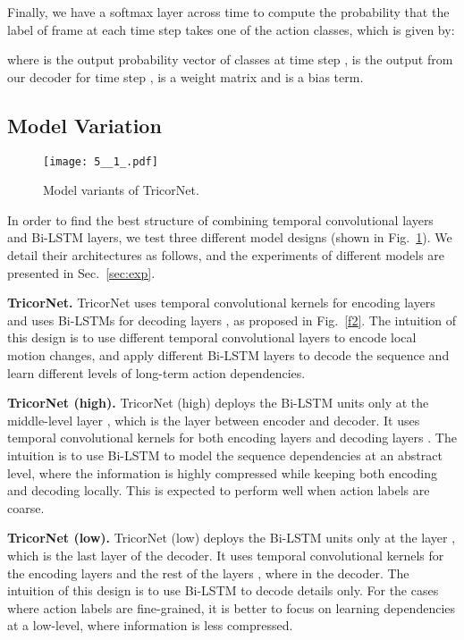 \documentclass{article}
\begin{document}
Finally, we have a softmax layer across time to compute the probability that the label of frame at each time step  takes one of the  action classes, which is given by: 

where  is the output probability vector of  classes at time step ,  is the output from our decoder for time step ,  is a weight matrix and  is a bias term. 

\subsection{Model Variation}

\begin{figure}[t]
\centering
\texttt{[image: 5\_\_1\_.pdf]}
\caption{Model variants of TricorNet.}
\label{f5}
\end{figure}

In order to find the best structure of combining temporal convolutional layers and Bi-LSTM layers, we test three different model designs (shown in Fig.~\ref{f5}). We detail their architectures as follows, and the experiments of different models are presented in Sec.~\ref{sec:exp}.

\noindent \textbf{TricorNet.} \quad TricorNet uses temporal convolutional kernels for encoding layers  and uses Bi-LSTMs for decoding layers , as proposed in Fig.~\ref{f2}. The intuition of this design is to use different temporal convolutional layers to encode local motion changes, and apply different Bi-LSTM layers to decode the sequence and learn different levels of long-term action dependencies.

\noindent \textbf{TricorNet (high).} \quad TricorNet (high) deploys the Bi-LSTM units only at the middle-level layer , which is the layer between encoder and decoder. It uses temporal convolutional kernels for both encoding layers  and decoding layers . The intuition is to use Bi-LSTM to model the sequence dependencies at an abstract level, where the information is highly compressed while keeping both encoding and decoding locally. This is expected to perform well when action labels are coarse.

\noindent \textbf{TricorNet (low).} \quad TricorNet (low) deploys the Bi-LSTM units only at the layer , which is the last layer of the decoder. It uses temporal convolutional kernels for the encoding layers  and the rest of the layers , where  in the decoder. The intuition of this design is to use Bi-LSTM to decode details only. For the cases where action labels are fine-grained, it is better to focus on learning dependencies at a low-level, where information is less compressed.
\end{document}
